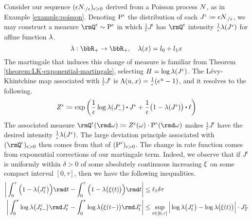 \begin{example}
  Consider our sequence $(\epsilon N_{\cdot/\epsilon})_{\epsilon>0}$ derived from a Poisson process $N$, as in Example \ref{example:poisson}.
  Denoting ${\operatorname{P}}^\epsilon$ the distribution of each $J^\epsilon \coloneqq \epsilon N_{\cdot/\epsilon}$, we may construct a measure $\mgPrb^\epsilon \sim \Prb^\epsilon$ in which $\frac1\epsilon J^\epsilon$ has $\mgPrb^\epsilon$ intensity $\frac1\epsilon\lambda(J^\epsilon)$ for affine function $\lambda$.
  \begin{equation*}
    \affInt: \bbR_+ \rightarrow \bbR_+, \quad \affInt(\stateVar) = \affIntPart_0 + \affIntPart_1 \stateVar
  \end{equation*}
  The martingale that induces this change of measure is familiar from Theorem \ref{theorem:LK-exponential-martingale}, selecting $H = \log\lambda(J^\epsilon)$.
  The L\'evy-Khintchine map associated with $\frac1\epsilon J^\epsilon$ is $\Lambda(u, x) = \frac1\epsilon (e^u - 1)$, and it resolves to the following.
  \begin{equation*}
    \mgDensity^\epsilon \defeq \exp\bigg( \frac1\epsilon \log\affInt(J^\epsilon_-) \shortInt J^\epsilon + \frac1\epsilon\big( 1 - \affInt(J^\epsilon) \big) \shortInt \leb \bigg)
  \end{equation*}
  The associated measure $\mgPrb^\epsilon(\rmd\omega) \defeq \mgDensity^\epsilon(\omega) \cdot \Prb^\epsilon(\rmd\omega)$ makes $\frac1\epsilon J^\epsilon$ have the desired intensity $\frac1\epsilon\lambda(J^\epsilon)$.
  The large deviation principle associated with $(\mgPrb^\epsilon)_{\epsilon>0}$ then comes from that of $({\operatorname{P}}^\epsilon)_{\epsilon>0}$.
  The change in rate function comes from exponential corrections of our martingale term.
  Indeed, we observe that if $J^\epsilon$ is uniformly within $\delta > 0$ of some absolutely continuous increasing $\xi$ on some compact interval $[0,\tau]$, then we have the following inequalities.
  \begin{align*}
    \bigg| \int_0^\tau \Big( 1 - \affInt\big(J^\epsilon_t\big) \Big) \rmd t - \int_0^\tau \Big( 1 - \affInt\big( \pathVar(t) \big) \Big) \rmd t \bigg|
    &\leq \ell_1 \delta \tau \\
    \bigg| \int_0^\tau \log\affInt\big(J^\epsilon_{t-}\big) \rmd J^\epsilon_t - \int_0^\tau \log\affInt\big(\pathVar(t-)\big) \rmd J^\epsilon_t \bigg| 
    &\leq \sup_{t\in[0,\tau]} \Big| \log\affInt\big(J^\epsilon_t\big) - \log\affInt\big(\pathVar(t)\big) \Big| \cdot J^\epsilon_T \\

\end{align*}
\end{example}
